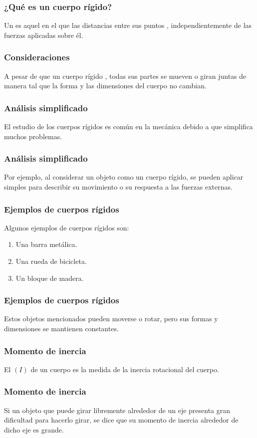 \documentclass[14pt]{beamer}
\begin{document}
\begin{frame}
\frametitle{¿Qué es un cuerpo rígido?}
Un  es aquel en el que las distancias entre sus puntos , independientemente de las fuerzas aplicadas sobre él.
\end{frame}
\begin{frame}
\frametitle{Consideraciones}
A pesar de que un cuerpo rígido , \pause todas sus partes se mueven o giran juntas de manera tal que la forma y las dimensiones del cuerpo no cambian.
\end{frame}
\begin{frame}
\frametitle{Análisis simplificado}
El estudio de los cuerpos rígidos es común en la mecánica debido a que simplifica muchos problemas.
\end{frame}
\begin{frame}
\frametitle{Análisis simplificado}
Por ejemplo, al considerar un objeto como un cuerpo rígido, \pause se pueden aplicar  simples para describir su movimiento o su respuesta a las fuerzas externas.
\end{frame}
\begin{frame}
\frametitle{Ejemplos de cuerpos rígidos}
Algunos ejemplos de cuerpos rígidos son:
\begin{enumerate}[<+->]
\item Una barra metálica.
\item Una rueda de bicicleta.
\item Un bloque de madera.
\end{enumerate}
\end{frame}
\begin{frame}
\frametitle{Ejemplos de cuerpos rígidos}
Estos objetos mencionados pueden moverse o rotar, pero sus formas y dimensiones se mantienen constantes.
\end{frame}
\begin{frame}
\frametitle{Momento de inercia}
El   $(I)$ de un cuerpo es la medida de la inercia rotacional del cuerpo.
\end{frame}
\begin{frame}
\frametitle{Momento de inercia}
Si un objeto que puede girar libremente alrededor de un eje presenta gran dificultad para hacerlo girar, se dice que su momento de inercia alrededor de dicho eje es grande.
\end{frame}
\end{document}
